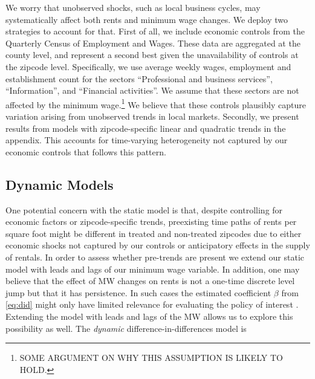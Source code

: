 
We worry that unobserved shocks, such as local business cycles, may systematically 
affect both rents and minimum wage changes. We deploy two strategies to account 
for that. First of all, we include economic controls from the Quarterly Census of 
Employment and Wages. These data are aggregated at the county level, and represent a 
second best given the unavailability of controls at the zipcode level. Specifically, we 
use average weekly wages, employment and establishment count for the sectors 
``Professional and business services'', ``Information'', and ``Financial activities''. 
We assume that these sectors are not affected by the minimum wage.\footnote{SOME ARGUMENT
	ON WHY THIS ASSUMPTION IS LIKELY TO HOLD.}
We believe that these controls plausibly capture variation arising from unobserved trends 
in local markets. Secondly, we present results from models with zipcode-specific linear 
and quadratic trends in the appendix. This accounts for time-varying heterogeneity not 
captured by our economic controls that follows this pattern.

\subsection{Dynamic Models}

One potential concern with the static model is that, despite controlling for economic 
factors or zipcode-specific trends, preexisting time paths of rents per square foot might 
be different in treated and non-treated zipcodes due to either economic shocks not 
captured by our controls or anticipatory effects 
in the supply of rentals. In order to assess whether pre-trends are present we extend our 
static model with leads and lags of our minimum wage variable. In addition, one may 
believe that the effect of MW changes on rents is not a one-time discrete level jump but 
that it has persistence. In such cases the estimated coefficient $\beta$ from 
\autoref{eq:did} might only have limited relevance for evaluating the policy of interest 
\parencite{callaway2019}. Extending the model with leads and lags of the MW allows us to 
explore this possibility as well. The \textit{dynamic} difference-in-differences model is

